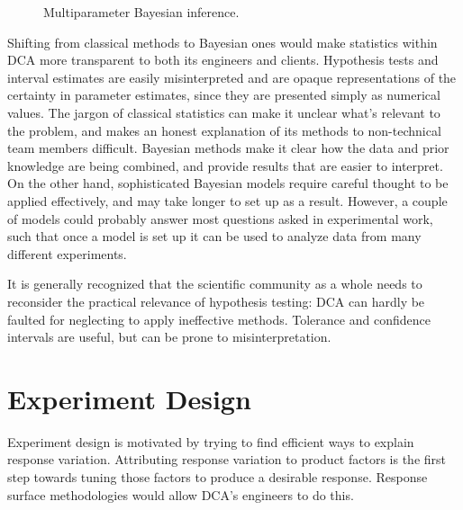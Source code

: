 \documentclass[11pt,a4paper,article]{memoir} %
\begin{document}
\begin{figure}
\centering
{}
\caption{Multiparameter Bayesian inference.}
\label{fig:multiparameter_bayes}
\end{figure}

Shifting from classical methods to Bayesian ones would make statistics within DCA more transparent to both its engineers and clients. Hypothesis tests and interval estimates are easily misinterpreted and are opaque representations of the certainty in parameter estimates, since they are presented simply as numerical values. The jargon of classical statistics can make it unclear what's relevant to the problem, and makes an honest explanation of its methods to non-technical team members difficult. Bayesian methods make it clear how the data and prior knowledge are being combined, and provide results that are easier to interpret. On the other hand, sophisticated Bayesian models require careful thought to be applied effectively, and  may take longer to set up as a result. However, a couple of models could probably answer most questions asked in experimental work, such that once a model is set up it can be used to analyze data from many different experiments.
\par
It is generally recognized that the scientific community as a whole needs to reconsider the practical relevance of hypothesis testing: DCA can hardly be faulted for neglecting to apply ineffective methods. Tolerance and confidence intervals are useful, but can be prone to misinterpretation. 

\section{Experiment Design}
Experiment design is motivated by trying to find efficient ways to explain response variation. Attributing response variation to product factors is the first step towards tuning those factors to produce a desirable response. Response surface methodologies would allow DCA's engineers to do this.
\end{document}
